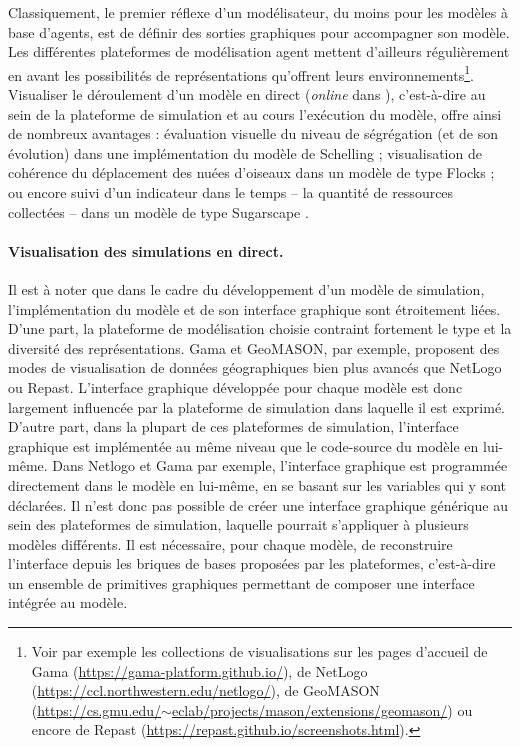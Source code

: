 Classiquement, le premier réflexe d'un modélisateur, du moins pour les modèles à base d'agents, est de définir des sorties graphiques pour accompagner son modèle.
Les différentes plateformes de modélisation agent mettent d'ailleurs régulièrement en avant les possibilités de représentations qu'offrent leurs environnements\footnote{
	Voir par exemple les collections de visualisations sur les pages d'accueil de Gama (\href{https://gama-platform.github.io/}{https://gama-platform.github.io/}), de NetLogo (\href{https://ccl.northwestern.edu/netlogo/}{https://ccl.northwestern.edu/netlogo/}), de GeoMASON (\href{https://cs.gmu.edu/~eclab/projects/mason/extensions/geomason/}{https://cs.gmu.edu/$\sim$eclab/projects/mason/extensions/geomason/}) ou encore de Repast (\href{https://repast.github.io/screenshots.html}{https://repast.github.io/screenshots.html}).
}.
Visualiser le déroulement d'un modèle \og en direct\fg{} (\og \textit{online}\fg{} dans \cite{grignard_agent-based_2017}), c'est-à-dire au sein de la plateforme de simulation et au cours l'exécution du modèle, offre ainsi de nombreux avantages : évaluation visuelle du niveau de ségrégation (et de son évolution) dans une implémentation du modèle de Schelling ; visualisation de cohérence du déplacement des nuées d'oiseaux dans un modèle de type \og Flocks\fg{} \autocite{reynolds_flocks_1987} ; ou encore suivi d'un indicateur dans le temps -- la quantité de ressources collectées -- dans un modèle de type \og Sugarscape\fg{} \autocite{epstein_growing_1996}.

\paragraph{Visualisation des simulations en direct.}

Il est à noter que dans le cadre du développement d'un modèle de simulation, l'implémentation du modèle et de son interface graphique sont étroitement liées.
D'une part, la plateforme de modélisation choisie contraint fortement le type et la diversité des représentations.
Gama et GeoMASON, par exemple, proposent des modes de visualisation de données géographiques bien plus avancés que NetLogo ou Repast.
L'interface graphique développée pour chaque modèle est donc largement influencée par la plateforme de simulation dans laquelle il est exprimé.
D'autre part, dans la plupart de ces plateformes de simulation, l'interface graphique est implémentée au même niveau que le code-source du modèle en lui-même.
Dans Netlogo et Gama par exemple, l'interface graphique est programmée directement dans le modèle en lui-même, en se basant sur les variables qui y sont déclarées.
Il n'est donc pas possible de créer une interface graphique générique au sein des plateformes de simulation, laquelle pourrait s'appliquer à plusieurs modèles différents.
Il est nécessaire, pour chaque modèle, de reconstruire l'interface depuis les briques de bases proposées par les plateformes, c'est-à-dire un ensemble de primitives graphiques permettant de composer une interface intégrée au modèle.

